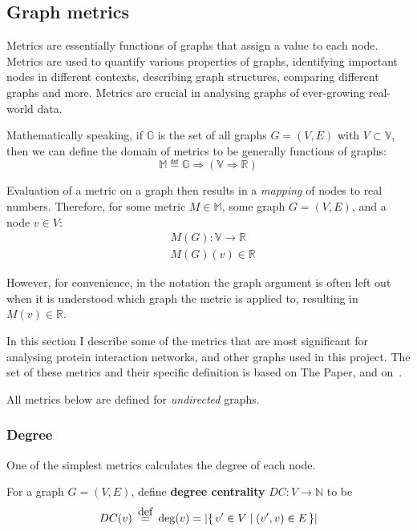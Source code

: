 \subsection{Graph metrics}

Metrics are essentially functions of graphs that assign a value to each node.
Metrics are used to quantify various properties of graphs, identifying important nodes in different contexts, describing graph structures, comparing different graphs and more.
Metrics are crucial in analysing graphs of ever-growing real-world data.

Mathematically speaking, if $\mathbb{G}$ is the set of all graphs $G = (V, E)$ with $V \subset \mathbb{V}$, then we can define the domain of metrics to be generally functions of graphs:
\begin{equation}
    \label{eqn:metric_type_def}
    \mathbb{M} \eqdef \mathbb{G} \Rightarrow (\mathbb{V} \Rightarrow \mathbb{R})
\end{equation}

Evaluation of a metric on a graph then results in a \textsl{mapping} of nodes to real numbers.
Therefore, for some metric $M \in \mathbb{M}$, some graph $G = (V, E)$, and a node $v \in V$:
\begin{align}
    &M(G) : \mathbb{V} \rightarrow \mathbb{R}\\
    &M(G)(v) \in \mathbb{R}
\end{align}

However, for convenience, in the notation the graph argument is often left out when it is understood which graph the metric is applied to, resulting in $M(v) \in \mathbb{R}$.

\parspace

In this section I describe some of the metrics that are most significant for analysing protein interaction networks, and other graphs used in this project.
The set of these metrics and their specific definition is based on The Paper\cite{Bozhilova2019}, and on~\cite{MartinHernandez2011}.

All metrics below are defined for \textsl{undirected} graphs.

\subsubsection{Degree}

One of the simplest metrics calculates the degree of each node.

\begin{definition}
    For a graph $G = (V, E)$, define \textbf{degree centrality} $DC : V \rightarrow \mathbb{N}$ to be
    \[ DC(v) \eqdef \deg(v) = \left| \Set{v' \in V}{(v', v) \in E} \right| \]
\end{definition}

